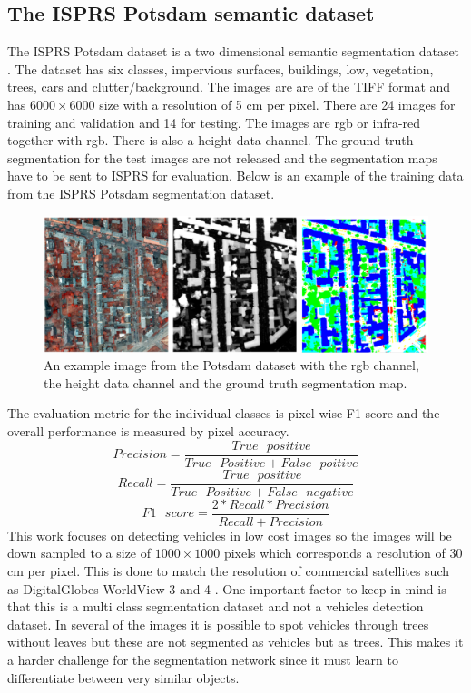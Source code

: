 \documentclass{kththesis}
\begin{document}
\subsection{The ISPRS Potsdam semantic dataset}
The ISPRS Potsdam dataset is a two dimensional semantic segmentation
dataset \cite{noauthor_2d_nodate}. The dataset has six classes, impervious surfaces, buildings, low, vegetation, trees, cars and clutter/background. The images are are of the TIFF format and has $6000 \times 6000$ size with a resolution of 5 cm per pixel. There are 24 images for training
and validation and 14 for testing. The images are rgb or infra-red together
with rgb. There is also a height data channel. The ground truth segmentation for the test images are not released and the segmentation maps have to be sent to ISPRS for evaluation. Below is an example of the training data from the ISPRS Potsdam segmentation dataset.
\begin{center}
\begin{figure}[H]
\centering
      \includegraphics[scale=0.25]{potsdam}
  \caption{An example image from the Potsdam dataset with the rgb
channel, the height data channel and the ground truth segmentation
map.}
\end{figure}
\end{center}
The evaluation metric for the individual classes is pixel wise F1 score and the
overall performance is measured by pixel accuracy.
\begin{equation}\label{eq:precision}
Precision=\frac{True\textit{ }positive}{True\textit{ }Positive+False\textit{ }poitive}
\end{equation}
\begin{equation}\label{eq:recall}
Recall=\frac{True\textit{ }positive}{True\textit{ }Positive+False\textit{ }negative}
\end{equation}
\begin{equation}\label{eq:f1}
F1\textit{ }score=\frac{2*Recall*Precision}{Recall+Precision}
\end{equation}
This work focuses on detecting vehicles in low cost images so the images will be down sampled to a size of $1000 \times 1000$ pixels which corresponds a resolution of 30 cm per pixel. This is done to match the resolution of commercial satellites such as DigitalGlobes WorldView 3 and 4 \cite{noauthor_worldview-3_nodate}. One important factor to keep in mind is that this is a multi class segmentation dataset and not a vehicles detection dataset. In several of the images it is possible to spot vehicles through trees without leaves but these are not segmented as vehicles but as trees. This makes it a harder challenge for the segmentation network since it must learn to differentiate between very similar objects.
\end{document}
